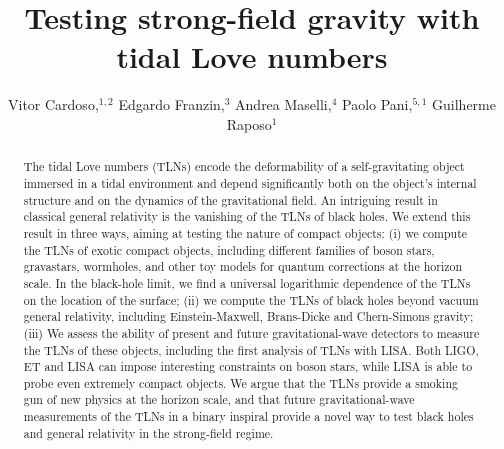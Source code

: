 \documentclass[aps,twocolumn,showpacs,preprintnumbers,nofootinbib,prd,superscriptaddress,groupedaddress,10pt]{revtex4-1}
\begin{document}
\title{Testing strong-field gravity with tidal Love numbers}


\author{
%
Vitor Cardoso,$^{1,2}$ 
%
Edgardo Franzin,$^{3}$
%
Andrea Maselli,$^4$
%
Paolo Pani,$^{5,1}$
%
Guilherme Raposo$^{1}$
}
%

%
%
%
%
%
%
\begin{abstract}
The tidal Love numbers (TLNs) encode the deformability of a self-gravitating object immersed in a tidal environment and depend significantly both on the object's internal structure and on the dynamics of the gravitational field. 
%
An intriguing result in classical general relativity is the vanishing of the TLNs of black holes. We extend this result in three ways, aiming at testing the nature of compact objects: (i) we compute the TLNs of exotic compact objects, including different families of boson stars, gravastars, wormholes, and other toy models for quantum corrections at the horizon scale. In the black-hole limit, we find a universal logarithmic dependence of the TLNs on the location of the surface; (ii) we compute the TLNs of black holes beyond vacuum general relativity, including Einstein-Maxwell, Brans-Dicke and Chern-Simons gravity;
(iii) We assess the ability of present and future gravitational-wave detectors to measure the TLNs of these objects,
including the first analysis of TLNs with LISA. 
Both LIGO, ET and LISA can impose interesting constraints on boson stars, while LISA is able to probe even extremely compact objects. 
%
We argue that the TLNs provide a smoking gun of new physics at the horizon scale, and that future gravitational-wave measurements of the TLNs in a binary inspiral provide a novel way to test black holes and general relativity in the strong-field regime.
\end{abstract}


\maketitle
\end{document}

